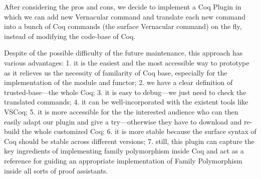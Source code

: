 After considering the pros and cons, we decide to implement a Coq Plugin in which we can add new Vernacular command and translate each new command into a bunch of Coq commands (the surface Vernacular command) on the fly, instead of modifying the code-base of Coq. 

Despite of the possible difficulty of the future maintenance, this approach has various advantages: 1. it is the easiest and the most accessible way to prototype as it relieves us the necessity of familarity of Coq base, especially for the implementation of the module and functor; 2. we have a clear definition of trusted-base---the whole Coq; 3. it is easy to debug---we just need to check the translated commands; 4. it can be well-incorporated with the existent tools like VSCoq; 5. it is more accessible for the the interested audience who can then easily adapt our plugin and give a try---otherwise they have to download and re-build the whole customized Coq; 6. it is more stable because the surface syntax of Coq should be stable across different versions; 7. still, this plugin can capture the key ingredients of implementing family polymorphism inside Coq and act as a reference for guiding an appropriate implementation of Family Polymorphism inside all sorts of proof assistants. 

